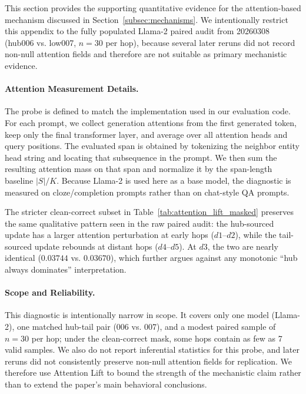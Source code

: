 This section provides the supporting quantitative evidence for the attention-based mechanism discussed in Section~\ref{subsec:mechanisms}. We intentionally restrict this appendix to the fully populated Llama-2 paired audit from 20260308 (hub006 vs. low007, $n=30$ per hop), because several later reruns did not record non-null attention fields and therefore are not suitable as primary mechanistic evidence.

\paragraph{Attention Measurement Details.}
The probe is defined to match the implementation used in our evaluation code. For each prompt, we collect generation attentions from the first generated token, keep only the final transformer layer, and average over all attention heads and query positions. The evaluated span is obtained by tokenizing the neighbor entity head string and locating that subsequence in the prompt. We then sum the resulting attention mass on that span and normalize it by the span-length baseline $|S|/K$. Because Llama-2 is used here as a base model, the diagnostic is measured on cloze/completion prompts rather than on chat-style QA prompts.



The stricter clean-correct subset in Table~\ref{tab:attention_lift_masked} preserves the same qualitative pattern seen in the raw paired audit: the hub-sourced update has a larger attention perturbation at early hops ($d1$--$d2$), while the tail-sourced update rebounds at distant hops ($d4$--$d5$). At $d3$, the two are nearly identical ($0.03744$ vs. $0.03670$), which further argues against any monotonic ``hub always dominates'' interpretation.

\paragraph{Scope and Reliability.}
This diagnostic is intentionally narrow in scope. It covers only one model (Llama-2), one matched hub-tail pair (006 vs. 007), and a modest paired sample of $n=30$ per hop; under the clean-correct mask, some hops contain as few as 7 valid samples. We also do not report inferential statistics for this probe, and later reruns did not consistently preserve non-null attention fields for replication. We therefore use Attention Lift to bound the strength of the mechanistic claim rather than to extend the paper's main behavioral conclusions.

